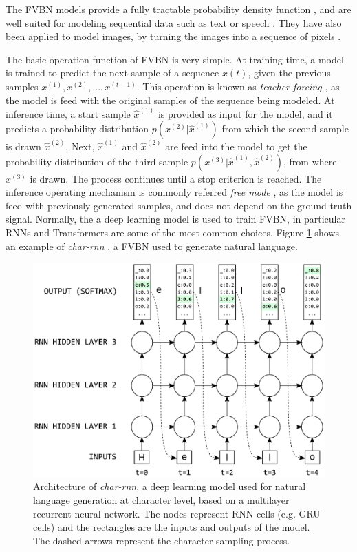 The FVBN models provide a fully tractable probability density function \autocite{Goodfellow2016}, and are well suited for modeling sequential data such as text or speech \autocite{Wang2017,Shen2018,liu2019b}. They have also been applied to model images, by turning the images into a sequence of pixels \autocite{Oord2016, Oord2016b}.

The basic operation function of FVBN is very simple. At training time, a model is trained to predict the next sample of a sequence $x(t)$, given the previous samples $ x^{(1)}, x^{(2)}, ..., x^{(t-1)}$. This operation is known as \textit{teacher forcing} \autocite{williams1989, goyal2016, Goodfellow2016}, as the model is feed with the original samples of the sequence being modeled. At inference time, a start sample $\hat{x}^{(1)}$ is provided as input for the model, and it predicts a probability distribution $p(x^{(2)}|\hat{x}^{(1)})$ from which the second sample is drawn $\hat{x}^{(2)}$. Next, $ \hat{x}^{(1)}$ and $\hat{x}^{(2)}$ are feed into the model to get the probability distribution of the third sample $p(x^{(3)}|\hat{x}^{(1)}, \hat{x}^{(2)})$, from where $x^(3)$ is drawn. The process continues until a stop criterion is reached. The inference operating mechanism is commonly referred \textit{free mode} \autocite{Goodfellow2016}, as the model is feed with previously generated samples, and does not depend on the ground truth signal. Normally, the a deep learning model is used to train FVBN, in particular RNNs and Transformers are some of the most common choices. Figure \ref{fig:charrnn} shows an example of \textit{char-rnn} \autocite{Sutskever2011, Graves2013}, a FVBN used to generate natural language.

\begin{figure}
	\centering
	\includegraphics[width=0.8\linewidth]{chapter2/images/char_rnn}
	\caption{Architecture of \textit{char-rnn}, a deep learning model used for natural language generation at character level, based on a multilayer recurrent neural network. The nodes represent RNN cells (e.g. GRU cells) and the rectangles are the inputs and outputs of the model. The dashed arrows represent the character sampling process.}
	\label{fig:charrnn}
\end{figure}


